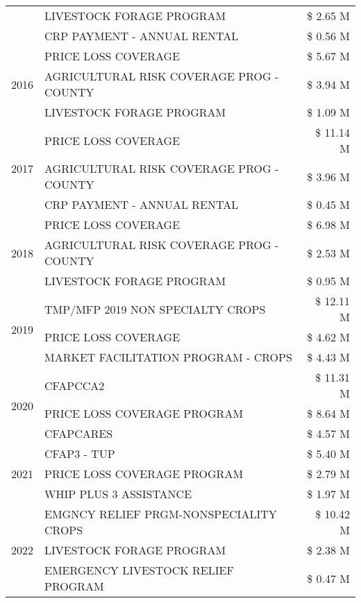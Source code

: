 \begin{tabular}{llr}
 & LIVESTOCK FORAGE PROGRAM & \$ 2.65 M \\
 & CRP PAYMENT - ANNUAL RENTAL & \$ 0.56 M \\
\cline{1-3}
\multirow[t]{3}{*}{2016} & PRICE LOSS COVERAGE & \$ 5.67 M \\
 & AGRICULTURAL RISK COVERAGE PROG - COUNTY & \$ 3.94 M \\
 & LIVESTOCK FORAGE PROGRAM & \$ 1.09 M \\
\cline{1-3}
\multirow[t]{3}{*}{2017} & PRICE LOSS COVERAGE & \$ 11.14 M \\
 & AGRICULTURAL RISK COVERAGE PROG - COUNTY & \$ 3.96 M \\
 & CRP PAYMENT - ANNUAL RENTAL & \$ 0.45 M \\
\cline{1-3}
\multirow[t]{3}{*}{2018} & PRICE LOSS COVERAGE & \$ 6.98 M \\
 & AGRICULTURAL RISK COVERAGE PROG - COUNTY & \$ 2.53 M \\
 & LIVESTOCK FORAGE PROGRAM & \$ 0.95 M \\
\cline{1-3}
\multirow[t]{3}{*}{2019} & TMP/MFP 2019 NON SPECIALTY CROPS & \$ 12.11 M \\
 & PRICE LOSS COVERAGE & \$ 4.62 M \\
 & MARKET FACILITATION PROGRAM - CROPS & \$ 4.43 M \\
\cline{1-3}
\multirow[t]{3}{*}{2020} & CFAPCCA2 & \$ 11.31 M \\
 & PRICE LOSS COVERAGE PROGRAM & \$ 8.64 M \\
 & CFAPCARES & \$ 4.57 M \\
\cline{1-3}
\multirow[t]{3}{*}{2021} & CFAP3 - TUP & \$ 5.40 M \\
 & PRICE LOSS COVERAGE PROGRAM & \$ 2.79 M \\
 & WHIP PLUS 3 ASSISTANCE & \$ 1.97 M \\
\cline{1-3}
\multirow[t]{3}{*}{2022} & EMGNCY RELIEF PRGM-NONSPECIALITY CROPS & \$ 10.42 M \\
 & LIVESTOCK FORAGE PROGRAM & \$ 2.38 M \\
 & EMERGENCY LIVESTOCK RELIEF PROGRAM & \$ 0.47 M \\
\cline{1-3}
\bottomrule
\end{tabular}
